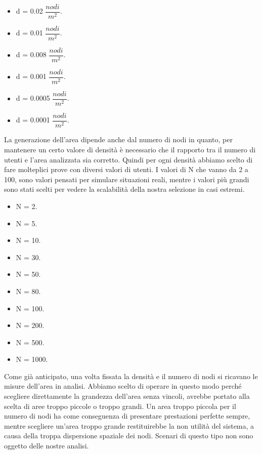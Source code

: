 \bigskip

\begin{itemize}
	\item d = 0.02 $ \dfrac{nodi}{m^{2}} $.
	\item d = 0.01 $ \dfrac{nodi}{m^{2}} $.
	\item d = 0.008 $ \dfrac{nodi}{m^{2}} $.
	\item d = 0.001 $ \dfrac{nodi}{m^{2}} $.
	\item d = 0.0005 $ \dfrac{nodi}{m^{2}} $.
	\item d = 0.0001 $ \dfrac{nodi}{m^{2}} $.
\end{itemize}
La generazione dell'area dipende anche dal numero di nodi in quanto, per mantenere un certo valore di densità è necessario che il rapporto tra il numero di utenti e l'area analizzata sia corretto. Quindi per ogni densità abbiamo scelto di fare molteplici prove con diversi valori di utenti. I valori di N che vanno da 2 a 100, sono valori pensati per simulare situazioni reali, mentre i valori più grandi sono stati scelti per vedere la scalabilità della nostra selezione in casi estremi.
\medskip

\begin{itemize}
	\item N = 2.
	\item N = 5.
	\item N = 10.
	\item N = 30.
	\item N = 50.
	\item N = 80.
	\item N = 100.
	\item N = 200.
	\item N = 500.
	\item N = 1000.
\end{itemize}
Come già anticipato, una volta fissata la densità e il numero di nodi si ricavano le misure dell'area in analisi. Abbiamo scelto di operare in questo modo perché scegliere direttamente la grandezza dell'area senza vincoli, avrebbe portato alla scelta di aree troppo piccole o troppo grandi. Un area troppo piccola per il numero di nodi ha come conseguenza di presentare prestazioni perfette sempre, mentre scegliere un'area troppo grande restituirebbe la non utilità del sistema, a causa della troppa dispersione spaziale dei nodi. Scenari di questo tipo non sono oggetto delle nostre analisi.

